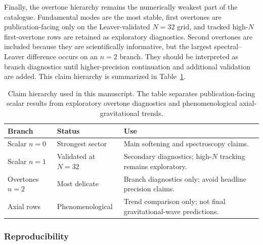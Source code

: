 ﻿\documentclass[12pt,a4paper]{article}
\begin{document}
Finally, the overtone hierarchy remains the numerically weakest part of the catalogue. Fundamental modes are the most stable, first overtones are publication-facing only on the Leaver-validated \(N=32\) grid, and tracked high-\(N\) first-overtone rows are retained as exploratory diagnostics. Second overtones are included because they are scientifically informative, but the largest spectral--Leaver difference occurs on an \(n=2\) branch. They should be interpreted as branch diagnostics until higher-precision continuation and additional validation are added. This claim hierarchy is summarized in Table~\ref{tab:claimhierarchy}.

\begin{table}[!htbp]
\centering
\footnotesize
\renewcommand{\arraystretch}{1.16}
\setlength{\tabcolsep}{3pt}
\begin{tabularx}{\columnwidth}{p{}p{}X}
\toprule
Branch & Status & Use \\
\midrule
Scalar \(n=0\) & Strongest sector & Main softening and spectroscopy claims. \\
Scalar \(n=1\) & Validated at \(N=32\) & Secondary diagnostics; high-\(N\) tracking remains exploratory. \\
Overtones \(n=2\) & Most delicate & Branch diagnostics only; avoid headline precision claims. \\
Axial rows & Phenomenological & Trend comparison only; not final gravitational-wave predictions. \\
\bottomrule
\end{tabularx}
\caption{Claim hierarchy used in this manuscript. The table separates publication-facing scalar results from exploratory overtone diagnostics and phenomenological axial-gravitational trends.}
\label{tab:claimhierarchy}
\end{table}

\subsubsection{Reproducibility}
\end{document}
